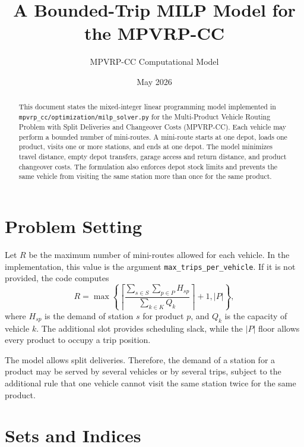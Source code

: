 \documentclass[11pt,a4paper]{article}
\title{\textbf{A Bounded-Trip MILP Model for the MPVRP-CC}}
\author{MPVRP-CC Computational Model}
\date{May 2026}
\begin{document}
\maketitle

\begin{abstract}
This document states the mixed-integer linear programming model implemented in
\texttt{mpvrp\_cc/optimization/milp\_solver.py} for the Multi-Product Vehicle Routing Problem with Split
Deliveries and Changeover Costs (MPVRP-CC). Each vehicle may perform a bounded
number of mini-routes. A mini-route starts at one depot, loads one product,
visits one or more stations, and ends at one depot. The model minimizes travel
distance, empty depot transfers, garage access and return distance, and product
changeover costs. The formulation also enforces depot stock limits and prevents
the same vehicle from visiting the same station more than once for the same
product.
\end{abstract}

\section{Problem Setting}

Let \(R\) be the maximum number of mini-routes allowed for each vehicle. In the
implementation, this value is the argument
\texttt{max\_trips\_per\_vehicle}. If it is not provided, the code computes
\[
    R =
    \max\left\{
        \left\lceil
        \frac{\sum_{s \in S}\sum_{p \in P} H_{sp}}
             {\sum_{k \in K} Q_k}
        \right\rceil + 1,
        |P|
    \right\},
\]
where \(H_{sp}\) is the demand of station \(s\) for product \(p\), and \(Q_k\)
is the capacity of vehicle \(k\). The additional slot provides scheduling
slack, while the \(|P|\) floor allows every product to occupy a trip position.

The model allows split deliveries. Therefore, the demand of a station for a
product may be served by several vehicles or by several trips, subject to the
additional rule that one vehicle cannot visit the same station twice for the
same product.

\section{Sets and Indices}
\end{document}
